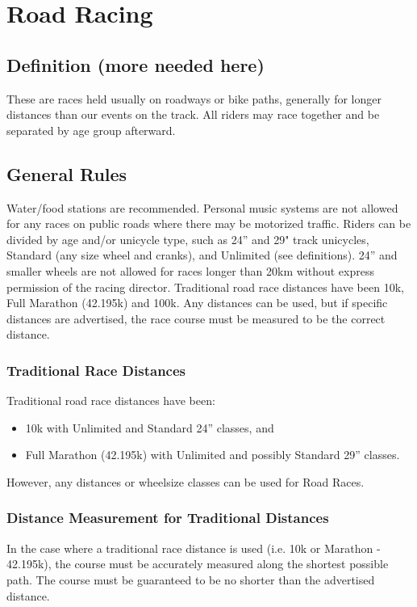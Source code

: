\chapter{Road Racing}

\section{Definition (more needed here)}
These are races held usually on roadways or bike paths, generally for longer distances than our events on the track. All riders may race together and be separated by age group afterward.

\section{General Rules}
Water/food stations are recommended. Personal music systems are not allowed for any races on public roads where there may be motorized traffic. Riders can be divided by age and/or unicycle type, such as 24” and 29" track unicycles, Standard (any size wheel and cranks), and Unlimited (see definitions). 24” and smaller wheels are not allowed for races longer than 20km without express permission of the racing director. Traditional road race distances have been 10k, Full Marathon (42.195k) and 100k. Any distances can be used, but if specific distances are advertised, the race course must be measured to be the correct distance.

\subsection{Traditional Race Distances}
Traditional road race distances have been: 
\begin{itemize}
\item 10k with Unlimited and Standard 24” classes, and 
\item Full Marathon (42.195k) with Unlimited and possibly Standard 29” classes.
\end{itemize}
However, any distances or wheelsize classes can be used for Road Races.

\subsection {Distance Measurement for Traditional Distances}
In the case where a traditional race distance is used (i.e. 10k or Marathon - 42.195k), the course must be accurately measured along the shortest possible path. The course must be guaranteed to be no shorter than the advertised distance.

